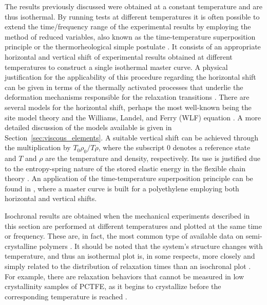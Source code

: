 The results previously discussed were obtained at a constant temperature and are thus isothermal.
By running tests at different temperatures it is often possible to extend the time/frequency range of the experimental results by employing the method of reduced variables, also known as the time-temperature superposition principle or the thermorheological simple postulate \citep{ferryViscoelasticPropertiesPolymers1980, christensen2013theory}.
It consists of an appropriate horizontal and vertical shift of experimental results obtained at different temperatures to construct a single isothermal master curve.
A physical justification for the applicability of this procedure regarding the horizontal shift can be given in terms of the thermally activated processes that underlie the deformation mechanisms responsible for the relaxation transitions \citep{arzhakovRelaxationPhysicalMechanical2019}.
There are several models for the horizontal shift, perhaps the most well-known being the site model theory and the Williams, Landel, and Ferry (WLF) equation \citep{wardIntroductionMechanicalProperties2004, furmanskiTimeTemperatureEquivalence2013}.
A more detailed discussion of the models available is given in Section~\ref{sec:viscous_elements}.
A suitable vertical shift can be achieved through the multiplication by $T_0\rho_0/T\rho$, where the subscript 0 denotes a reference state and $T$ and $\rho$ are the temperature and density, respectively.
Its use is justified due to the entropy-spring nature of the stored elastic energy in the flexible chain theory \citep{ferryViscoelasticPropertiesPolymers1980}.
An application of the time-temperature superposition principle can be found in \cite{popelarViscoelasticMaterialCharacterization1990}, where a master curve is built for a polyethylene employing both horizontal and vertical shifts.

Isochronal results are obtained when the mechanical experiments described in this section are performed at different temperatures and plotted at the same time or frequency.
These are, in fact, the most common type of available data on semi-crystalline polymers \citep{ferryViscoelasticPropertiesPolymers1980}.
It should be noted that the system's structure changes with temperature, and thus an isothermal plot is, in some respects, more closely and simply related to the distribution of relaxation times than an isochronal plot \citep{hoffmanAnalysisRelaxationsPolychlorotrifluoroethylene2007}.
For example, there are relaxation behaviors that cannot be measured in low crystallinity samples of PCTFE, as it begins to crystallize before the corresponding temperature is reached \citep{hoffmanAnalysisRelaxationsPolychlorotrifluoroethylene2007}.


